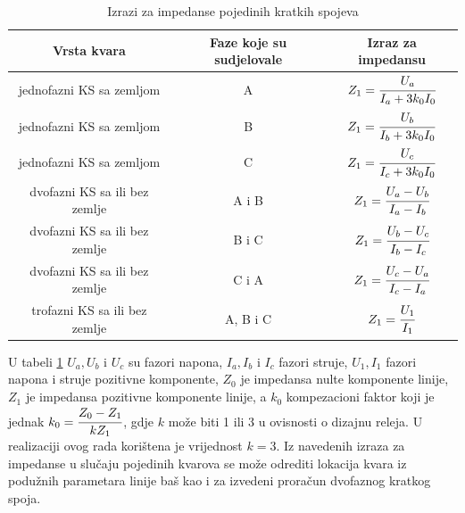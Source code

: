 \renewcommand{\arraystretch}{1.5}%
\begin{table} [!ht]
  \caption{Izrazi za impedanse pojedinih kratkih spojeva}
  \begin{center}
  \begin{tabular}{ | c | c | c | }
	\hline
      \textbf{Vrsta kvara} & \textbf{Faze koje su sudjelovale} & \textbf{Izraz za impedansu} \\
    \hline 
    \hline 
     jednofazni KS sa zemljom & A &  $Z_1=\cfrac{U_a}{I_a+3k_0I_0}$ \\[10pt]
    \hline
    jednofazni KS sa zemljom & B &  $Z_1=\cfrac{U_b}{I_b+3k_0I_0}$ \\[10pt]
    \hline
    jednofazni KS sa zemljom & C &  $Z_1=\cfrac{U_c}{I_c+3k_0I_0}$ \\[10pt]
    \hline
    dvofazni KS sa ili bez zemlje & A i B &  $Z_1=\cfrac{U_a-U_b}{I_a-I_b}$ \\[10pt]
    \hline
    dvofazni KS sa ili bez zemlje & B i C &  $Z_1=\cfrac{U_b-U_c}{I_b-I_c}$ \\[10pt]
    \hline
     dvofazni KS sa ili bez zemlje & C i A &  $Z_1=\cfrac{U_c-U_a}{I_c-I_a}$ \\[10pt]
    \hline
    trofazni KS sa ili bez zemlje & A, B i C &  $Z_1=\cfrac{U_1}{I_1}$ \\[10pt]
    \hline
    
  \end{tabular}
  \label{tab:impedanse}    
\end{center} 
\end{table}
\renewcommand{\arraystretch}{1} %

U tabeli \ref{tab:impedanse} $U_a, U_b $ i $U_c$ su fazori napona, $I_a, I_b $ i $I_c$ fazori struje, $U_1, I_1$ fazori napona i struje pozitivne komponente, $Z_0$ je impedansa nulte komponente linije, $Z_1$ je impedansa pozitivne komponente linije, a $k_0$ kompezacioni faktor koji je jednak $k_0=\cfrac{Z_0-Z_1}{kZ_1}$, gdje $k$ može biti 1 ili 3 u ovisnosti o dizajnu releja. U realizaciji ovog rada korištena je vrijednost $k=3$. Iz navedenih izraza za impedanse u slučaju pojedinih kvarova se može odrediti lokacija kvara iz podužnih parametara linije baš kao i za izvedeni proračun dvofaznog kratkog spoja. 

